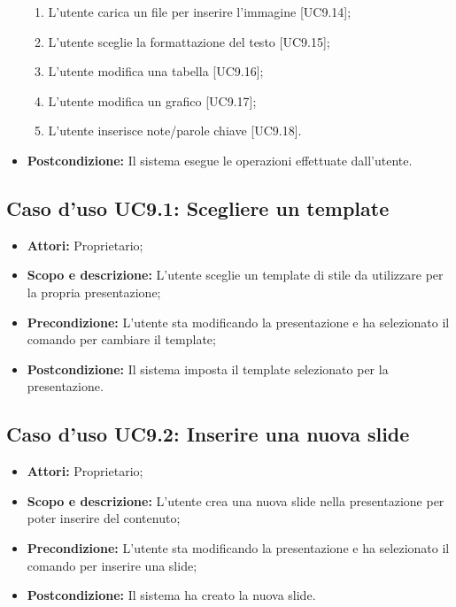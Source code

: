 \begin{itemize}
\begin{enumerate}
		\item L'utente carica un file per inserire l'immagine [UC9.14];
		\item L'utente sceglie la formattazione del testo [UC9.15];
		\item L'utente modifica una tabella [UC9.16];
		\item L'utente modifica un grafico [UC9.17];
		
		\item L'utente inserisce note/parole chiave [UC9.18].
	\end{enumerate}
	\item \textbf{Postcondizione:} Il sistema esegue le operazioni effettuate dall'utente.
\end{itemize}


\subsection{Caso d'uso UC9.1: Scegliere un \gls{template}}
\begin{itemize}
	\item \textbf{Attori:} Proprietario;
	\item \textbf{Scopo e descrizione:} L'utente sceglie un \gls{template} di stile da utilizzare per la propria presentazione;
	\item \textbf{Precondizione:} L'utente sta modificando la presentazione e ha selezionato il comando per cambiare il template;
	\item \textbf{Postcondizione:} Il sistema imposta il \gls{template} selezionato per la presentazione.
\end{itemize}


\subsection{Caso d'uso UC9.2: Inserire una nuova \gls{slide}}
\begin{itemize}
	\item \textbf{Attori:} Proprietario;
	\item \textbf{Scopo e descrizione:} L'utente crea una nuova \gls{slide} nella presentazione per poter inserire del contenuto;
	\item \textbf{Precondizione:} L'utente sta modificando la presentazione e ha selezionato il comando per inserire una \gls{slide};
	\item \textbf{Postcondizione:} Il sistema ha creato la nuova \gls{slide}.
\end{itemize}


